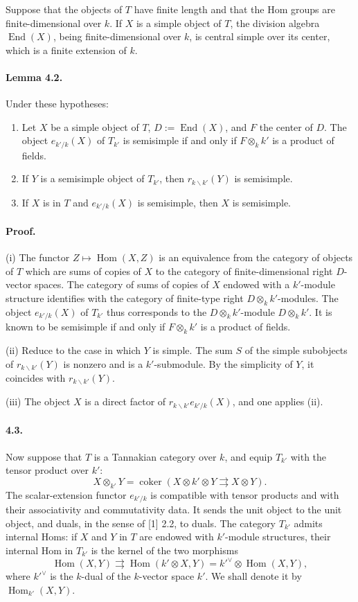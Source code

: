 \documentclass[11pt]{article}
\newcommand{\End}{\operatorname{End}}
\newcommand{\Hom}{\operatorname{Hom}}
\newcommand{\coker}{\operatorname{coker}}
\theoremstyle{plain}
\theoremstyle{definition}
\begin{document}
Suppose that the objects of $T$ have finite length and that the Hom groups are finite-dimensional over $k$. If $X$ is a simple object of $T$, the division algebra $\End(X)$, being finite-dimensional over $k$, is central simple over its center, which is a finite extension of $k$.

\paragraph{Lemma 4.2.} Under these hypotheses:
\begin{enumerate}[label=(\roman*)]
\item Let $X$ be a simple object of $T$, $D:=\End(X)$, and $F$ the center of $D$. The object $e_{k'/k}(X)$ of $T_{k'}$ is semisimple if and only if $F\otimes_k k'$ is a product of fields.
\item If $Y$ is a semisimple object of $T_{k'}$, then $r_{k\backslash k'}(Y)$ is semisimple.
\item If $X$ is in $T$ and $e_{k'/k}(X)$ is semisimple, then $X$ is semisimple.
\end{enumerate}

\paragraph{Proof.} (i) The functor $Z\mapsto\Hom(X,Z)$ is an equivalence from the category of objects of $T$ which are sums of copies of $X$ to the category of finite-dimensional right $D$-vector spaces. The category of sums of copies of $X$ endowed with a $k'$-module structure identifies with the category of finite-type right $D\otimes_k k'$-modules. The object $e_{k'/k}(X)$ of $T_{k'}$ thus corresponds to the $D\otimes_k k'$-module $D\otimes_k k'$. It is known to be semisimple if and only if $F\otimes_k k'$ is a product of fields.

(ii) Reduce to the case in which $Y$ is simple. The sum $S$ of the simple subobjects of $r_{k\backslash k'}(Y)$ is nonzero and is a $k'$-submodule. By the simplicity of $Y$, it coincides with $r_{k\backslash k'}(Y)$.

(iii) The object $X$ is a direct factor of $r_{k\backslash k'}e_{k'/k}(X)$, and one applies (ii).

\paragraph{4.3.} Now suppose that $T$ is a Tannakian category over $k$, and equip $T_{k'}$ with the tensor product over $k'$:
\[
   X\otimes_{k'}Y=\coker(X\otimes k'\otimes Y\rightrightarrows X\otimes Y).
\]
The scalar-extension functor $e_{k'/k}$ is compatible with tensor products and with their associativity and commutativity data. It sends the unit object to the unit object, and duals, in the sense of [1] 2.2, to duals. The category $T_{k'}$ admits internal Homs: if $X$ and $Y$ in $T$ are endowed with $k'$-module structures, their internal Hom in $T_{k'}$ is the kernel of the two morphisms
\[
   \Hom(X,Y)\rightrightarrows \Hom(k'\otimes X,Y)=k'^{\vee}\otimes\Hom(X,Y),
\]
where $k'^{\vee}$ is the $k$-dual of the $k$-vector space $k'$. We shall denote it by $\Hom_{k'}(X,Y)$.
\end{document}
